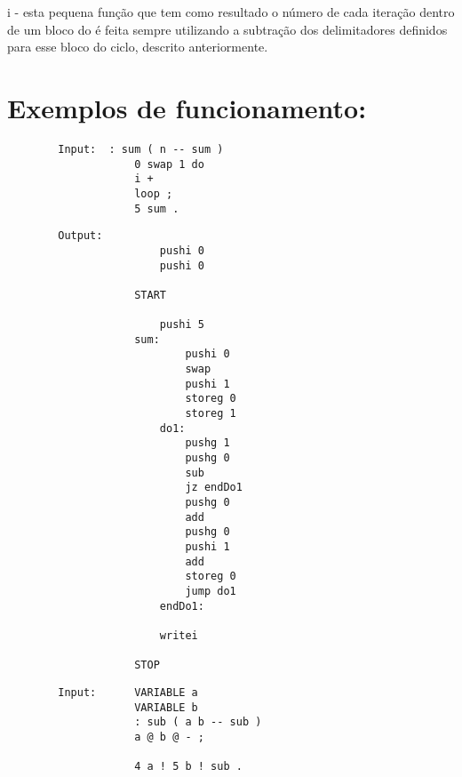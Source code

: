 \documentclass{article}
\begin{document}
    i - esta pequena função que tem como resultado o número de cada iteração dentro de um bloco do é feita sempre utilizando a subtração dos delimitadores definidos para esse bloco do ciclo, descrito anteriormente.
   
    \vspace{10cm}

\section{Exemplos de funcionamento:}
        \vspace{2cm}
        
        \begin{verbatim}
        Input:  : sum ( n -- sum )
                    0 swap 1 do
                    i +
                    loop ;
                    5 sum .
        \end{verbatim}

        
        \begin{verbatim}
        Output: 	
                    	pushi 0
                    	pushi 0
                    
                    START
                    
                    	pushi 5
                    sum:
                    		pushi 0
                    		swap
                    		pushi 1
                    		storeg 0
                    		storeg 1
                    	do1:
                    		pushg 1
                    		pushg 0
                    		sub
                    		jz endDo1
                    		pushg 0
                    		add
                    		pushg 0
                    		pushi 1
                    		add
                    		storeg 0
                    		jump do1
                    	endDo1:
                    	
                    	writei
                    
                    STOP
        \end{verbatim}
        
    \vspace{1cm}

    \vspace{0.5cm}
        
        \begin{verbatim}
        Input:      VARIABLE a 
                    VARIABLE b 
                    : sub ( a b -- sub )
                    a @ b @ - ;
                
                    4 a ! 5 b ! sub .

        \end{verbatim}
\end{document}
